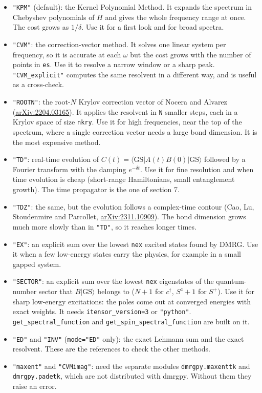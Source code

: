 \documentclass[11pt]{article}
\providecommand{\tightlist}{\setlength{\itemsep}{0pt}\setlength{\parskip}{0pt}}
\begin{document}
\begin{itemize}
\tightlist
\item
  \texttt{"KPM"} (default): the Kernel Polynomial Method. It expands the spectrum
  in Chebyshev polynomials of \(H\) and gives the whole frequency range at
  once. The cost grows as \(1/\delta\). Use it for a first look and for broad
  spectra.
\item
  \texttt{"CVM"}: the correction-vector method. It solves one linear system per
  frequency, so it is accurate at each \(\omega\) but the cost grows with
  the number of points in \texttt{es}. Use it to resolve a narrow window or a
  sharp peak. \texttt{"CVM\_\allowbreak{}explicit"} computes the same resolvent in a different
  way, and is useful as a cross-check.
\item
  \texttt{"ROOTN"}: the root-\(N\) Krylov correction vector of Nocera and Alvarez
  (\href{https://arxiv.org/abs/2204.03165}{arXiv:2204.03165}). It applies the
  resolvent in \texttt{N} smaller steps, each in a Krylov space of size \texttt{nkry}.
  Use it for high frequencies, near the top of the spectrum, where a
  single correction vector needs a large bond dimension. It is the most
  expensive method.
\item
  \texttt{"TD"}: real-time evolution of \(C(t)=\langle\mathrm{GS}|A(t)B(0)|\mathrm{GS}\rangle\)
  followed by a Fourier transform with the damping \(e^{-\delta t}\). Use it
  for fine resolution and when time evolution is cheap (short-range
  Hamiltonians, small entanglement growth). The time propagator is the one
  of section 7.
\item
  \texttt{"TDZ"}: the same, but the evolution follows a complex-time contour (Cao,
  Lu, Stoudenmire and Parcollet,
  \href{https://arxiv.org/abs/2311.10909}{arXiv:2311.10909}). The bond dimension
  grows much more slowly than in \texttt{"TD"}, so it reaches longer times.
\item
  \texttt{"EX"}: an explicit sum over the lowest \texttt{nex} excited states found by
  DMRG. Use it when a few low-energy states carry the physics, for example
  in a small gapped system.
\item
  \texttt{"SECTOR"}: an explicit sum over the lowest \texttt{nex} eigenstates of the
  quantum-number sector that \(B|\mathrm{GS}\rangle\) belongs to (\(N+1\) for
  \(c^\dagger\), \(S^z+1\) for \(S^+\)). Use it for sharp low-energy
  excitations: the poles come out at converged energies with exact weights.
  It needs \texttt{itensor\_\allowbreak{}version=3} or \texttt{"python"}. \texttt{get\_\allowbreak{}spectral\_\allowbreak{}function} and
  \texttt{get\_\allowbreak{}spin\_\allowbreak{}spectral\_\allowbreak{}function} are built on it.
\item
  \texttt{"ED"} and \texttt{"INV"} (\texttt{mode="ED"} only): the exact Lehmann sum and the
  exact resolvent. These are the references to check the other methods.
\item
  \texttt{"maxent"} and \texttt{"CVMimag"}: need the separate modules \texttt{dmrgpy.\allowbreak{}maxenttk}
  and \texttt{dmrgpy.\allowbreak{}padetk}, which are not distributed with dmrgpy. Without them
  they raise an error.
\end{itemize}
\end{document}
